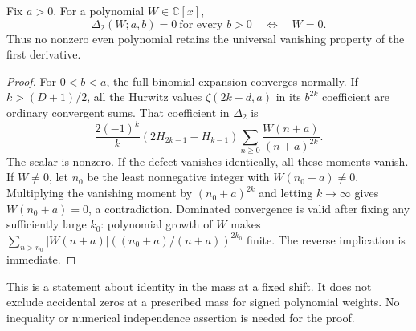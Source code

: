 \begin{theorem}
\label{sd:thm:vanishing}
Fix $a>0$.  For a polynomial $W\in\mathbb C[x]$,
\[
 \Delta_2(W;a,b)=0\ \text{for every }b>0
 \quad\Longleftrightarrow\quad W=0.
\]
Thus no nonzero even polynomial retains the universal vanishing
property of the first derivative.
\end{theorem}
\begin{proof}
For $0<b<a$, the full binomial expansion converges normally.  If
$k>(D+1)/2$, all the Hurwitz values $\zeta(2k-d,a)$ in its
$b^{2k}$ coefficient are ordinary convergent sums.  That coefficient
in $\Delta_2$ is
\begin{equation}\label{sd:eq:high-mass-coeff}
 \frac{2(-1)^k}{k}(2H_{2k-1}-H_{k-1})
             \sum_{n\ge0}\frac{W(n+a)}{(n+a)^{2k}}.
\end{equation}
The scalar is nonzero.  If the defect vanishes identically, all these
moments vanish.  If $W\ne0$, let $n_0$ be the least nonnegative integer
with $W(n_0+a)\ne0$.  Multiplying the vanishing moment by
$(n_0+a)^{2k}$ and letting $k\to\infty$ gives
$W(n_0+a)=0$, a contradiction.  Dominated convergence is valid after
fixing any sufficiently large $k_0$: polynomial growth of $W$ makes
$\sum_{n>n_0}|W(n+a)|((n_0+a)/(n+a))^{2k_0}$ finite.
The reverse implication is immediate.
\end{proof}

This is a statement about identity in the mass at a fixed shift.
It does not exclude accidental zeros at a prescribed mass for signed
polynomial weights.  No inequality or numerical independence assertion
is needed for the proof.

